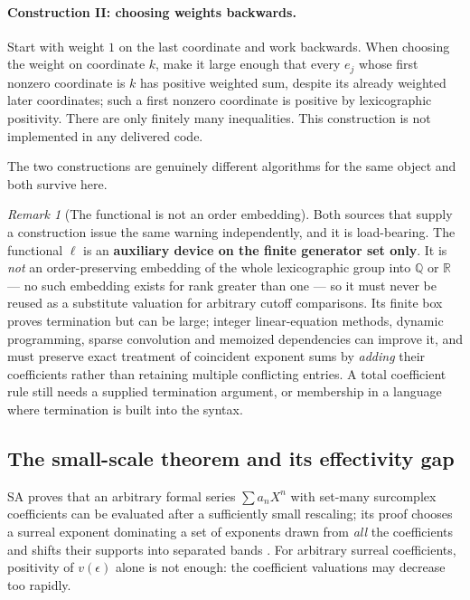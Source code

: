 \documentclass[11pt,letterpaper]{article}
\numberwithin{equation}{section}
\theoremstyle{definition}
\theoremstyle{remark}
\newtheorem{remark}[theorem]{Remark}
\newcommand{\R}{\mathbb R}
\newcommand{\Q}{\mathbb Q}
\begin{document}
\paragraph{Construction II: choosing weights backwards.}
Start with weight $1$ on the last coordinate and work backwards. When choosing
the weight on coordinate $k$, make it large enough that every $e_j$ whose first
nonzero coordinate is $k$ has positive weighted sum, despite its already
weighted later coordinates; such a first nonzero coordinate is positive by
lexicographic positivity. There are only finitely many inequalities. This
construction is not implemented in any delivered code.

The two constructions are genuinely different algorithms for the same object and
both survive here.

\begin{remark}[The functional is not an order embedding]\label{cas:rem-notembedding}
Both sources that supply a construction issue the same warning independently,
and it is load-bearing. The functional $\ell$ is an \textbf{auxiliary device on
the finite generator set only}. It is \emph{not} an order-preserving embedding
of the whole lexicographic group into $\Q$ or $\R$ --- no such embedding exists
for rank greater than one --- so it must never be reused as a substitute
valuation for arbitrary cutoff comparisons. Its finite box proves termination
but can be large; integer linear-equation methods, dynamic programming, sparse
convolution and memoized dependencies can improve it, and must preserve exact
treatment of coincident exponent sums by \emph{adding} their coefficients rather
than retaining multiple conflicting entries. A total coefficient rule still
needs a supplied termination argument, or membership in a language where
termination is built into the syntax.
\end{remark}

\subsection{The small-scale theorem and its effectivity gap}
\label{cas:sub-smallscale}
SA proves that an arbitrary formal series $\sum a_nX^n$ with set-many surcomplex
coefficients can be evaluated after a sufficiently small rescaling; its proof
chooses a surreal exponent dominating a set of exponents drawn from \emph{all}
the coefficients and shifts their supports into separated bands
\cite{cas:SourceAnalysisTwo,cas:SourceAnalysisThree}. For arbitrary surreal
coefficients, positivity of $v(\epsilon)$ alone is not enough: the coefficient
valuations may decrease too rapidly.
\end{document}
